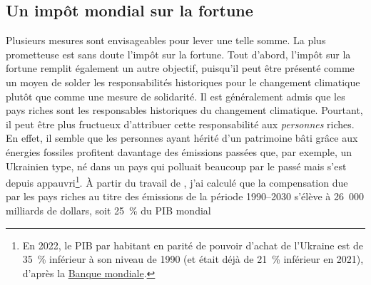 \documentclass[a5paper,french,openany]{memoir}
\begin{document}
\subsection{Un impôt mondial sur la fortune} %
Plusieurs mesures sont envisageables pour lever une telle somme. La plus prometteuse est sans doute l'impôt sur la fortune. Tout d'abord, l'impôt sur la fortune remplit également un autre objectif, puisqu'il peut être présenté comme un moyen de solder 
les responsabilités historiques pour le changement climatique plutôt que comme une mesure de solidarité. Il est généralement admis que les pays riches sont les responsables historiques du changement climatique. Pourtant, il peut être plus fructueux d'attribuer cette responsabilité aux \textit{personnes} riches. En effet, il semble que les personnes ayant hérité d'un patrimoine bâti grâce aux énergies fossiles profitent davantage des émissions passées que, par exemple, un Ukrainien type, né dans un pays qui polluait beaucoup par le passé mais s'est depuis appauvri\footnote{En 2022, le PIB par habitant en parité de pouvoir d'achat de l'Ukraine est de 35~\% inférieur à son niveau de 1990 (et était déjà de 21~\% inférieur en 2021), d'après la \href{https://data.worldbank.org/indicator/NY.GDP.PCAP.PP.KD?locations=UA}{Banque mondiale}.}. %
À partir du travail de \cite{fanning_compensation_2023}, j'ai calculé que la compensation due par les pays riches au titre des émissions de la période 1990--2030 s'élève à 26~000 milliards de dollars, soit 25~\% du PIB mondial
\end{document}
